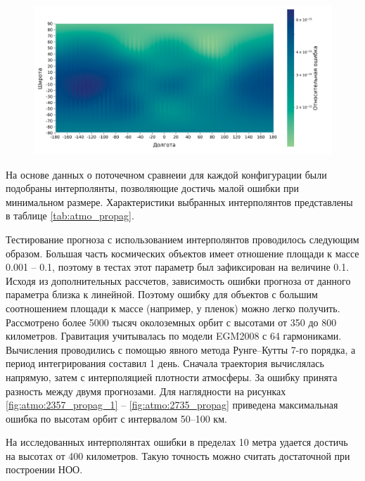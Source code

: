  \begin{figure}[h!]
    \centering
    \includegraphics[width=\linewidth]{../images/solution/atmo/2753_latlon_abs_error_heatmap.png}
    \label{fig:atmo:2753_latlon_abs_err}
 \end{figure}

 На основе данных о поточечном сравнеии для каждой конфигурации были подобраны интерполянты, 
 позволяющие достичь малой ошибки при минимальном размере. 
 Характеристики выбранных интерполянтов представлены в таблице \ref{tab:atmo_propag}.

 Тестирование прогноза с использованием интерполянтов проводилось следующим образом.
 Большая часть космических объектов имеет отношение площади к массе 0.001 -- 0.1,
 поэтому в тестах этот параметр был зафиксирован на величине 0.1. Исходя из дополнительных
 рассчетов, зависимость ошибки прогноза от данного параметра близка к линейной. Поэтому
 ошибку для объектов с большим соотношением площади к массе (например, у пленок) 
 можно легко получить.
 Рассмотрено более 5000 тысяч околоземных орбит с высотами от 350 до 800 километров. 
 Гравитация учитывалась по модели EGM2008 с 64 гармониками. Вычисления проводились
 с помощью явного метода Рунге--Кутты 7-го порядка, а период интегрирования составил 1 день.
 Сначала траектория вычислялась напрямую, затем с интерполяцией плотности атмосферы.
 За ошибку принята разность между двумя прогнозами. Для наглядности на рисунках 
 \ref{fig:atmo:2357_propag_1} -- \ref{fig:atmo:2735_propag}
 приведена максимальная ошибка по высотам орбит с интервалом 50--100 км.

 На исследованных интерполянтах ошибки в пределах 10 метра удается достичь на высотах
 от 400 километров. Такую точность можно считать достаточной при построении НОО.


